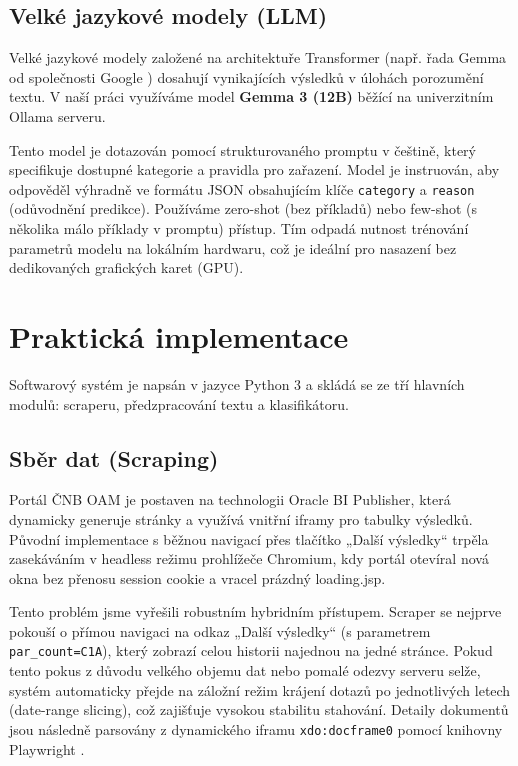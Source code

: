 \documentclass[czech, oth, kky, he, iso690alph, pdf, viewonly]{fasthesis}%
\begin{document}
\section{Velké jazykové modely (LLM)}
Velké jazykové modely založené na architektuře Transformer (např. řada Gemma od společnosti Google \cite{gemma3}) dosahují vynikajících výsledků v úlohách porozumění textu. V naší práci využíváme model \textbf{Gemma 3 (12B)} běžící na univerzitním Ollama serveru. 

Tento model je dotazován pomocí strukturovaného promptu v češtině, který specifikuje dostupné kategorie a pravidla pro zařazení. Model je instruován, aby odpověděl výhradně ve formátu JSON obsahujícím klíče \texttt{category} a \texttt{reason} (odůvodnění predikce). Používáme zero-shot (bez příkladů) nebo few-shot (s několika málo příklady v promptu) přístup. Tím odpadá nutnost trénování parametrů modelu na lokálním hardwaru, což je ideální pro nasazení bez dedikovaných grafických karet (GPU).

\chapter{Praktická implementace}
Softwarový systém je napsán v jazyce Python 3 a skládá se ze tří hlavních modulů: scraperu, předzpracování textu a klasifikátoru.

\section{Sběr dat (Scraping)}
Portál ČNB OAM \cite{cnboam} je postaven na technologii Oracle BI Publisher, která dynamicky generuje stránky a využívá vnitřní iframy pro tabulky výsledků. Původní implementace s běžnou navigací přes tlačítko „Další výsledky“ trpěla zasekáváním v headless režimu prohlížeče Chromium, kdy portál otevíral nová okna bez přenosu session cookie a vracel prázdný loading.jsp.

Tento problém jsme vyřešili robustním hybridním přístupem. Scraper se nejprve pokouší o přímou navigaci na odkaz „Další výsledky“ (s parametrem \texttt{par\_count=C1A}), který zobrazí celou historii najednou na jedné stránce. Pokud tento pokus z důvodu velkého objemu dat nebo pomalé odezvy serveru selže, systém automaticky přejde na záložní režim krájení dotazů po jednotlivých letech (date-range slicing), což zajišťuje vysokou stabilitu stahování. Detaily dokumentů jsou následně parsovány z dynamického iframu \texttt{xdo:docframe0} pomocí knihovny Playwright \cite{playwright}.
\end{document}
